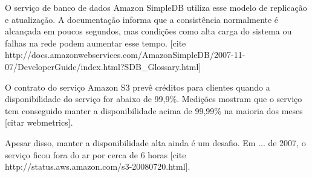 
O serviço de banco de dados Amazon SimpleDB utiliza esse modelo de replicação e atualização. A documentação informa que a consistência normalmente é alcançada em poucos segundos, mas condições como alta carga do sistema ou falhas na rede podem aumentar esse tempo. [cite http://docs.amazonwebservices.com/AmazonSimpleDB/2007-11-07/DeveloperGuide/index.html?SDB\_Glossary.html]


O contrato do serviço Amazon S3 prevê créditos para clientes quando a disponibilidade do serviço for abaixo de 99,9\%. Medições mostram que o serviço tem conseguido manter a disponibilidade acima de 99,99\% na maioria dos meses [citar webmetrics].

Apesar disso, manter a disponibilidade alta ainda é um desafio. Em ... de 2007, o serviço ficou fora do ar por cerca de 6 horas [cite http://status.aws.amazon.com/s3-20080720.html].














